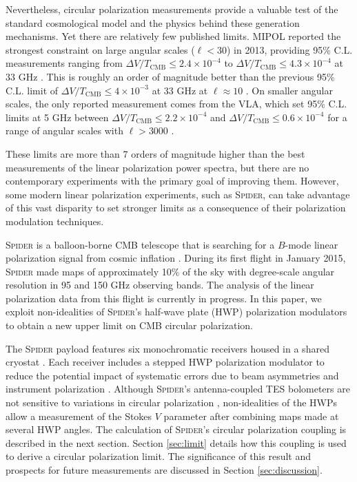 \documentclass[twocolumn]{aastex61}
\begin{document}
Nevertheless, circular polarization measurements provide a valuable test of the standard cosmological model and the physics behind these generation mechanisms.  Yet there are relatively few published limits.  MIPOL reported the strongest constraint on large angular scales ($\ell < 30$) in 2013, providing  95\% C.L. measurements ranging from $\Delta V/T_{\mathrm{CMB}}\leq 2.4 \times 10^{-4} $ to $\Delta V/T_{\mathrm{CMB}}\leq 4.3 \times 10^{-4} $  at 33 GHz \citep{Mipol}. This is roughly an order of magnitude better than the previous 95\% C.L. limit of $\Delta V/T_{\mathrm{CMB}}\leq 4 \times 10^{-3} $ at 33 GHz at $\ell \approx 10$ \citep{Vlim2}.  On smaller angular scales, the only reported measurement comes from the VLA, which set 95\% C.L. limits at 5 GHz between $\Delta V/T_{\mathrm{CMB}}\leq 2.2 \times 10^{-4} $ and $\Delta V/T_{\mathrm{CMB}}\leq 0.6 \times 10^{-4} $ for a range of angular scales with $\ell > 3000$ \citep{Vlim3}. 

These limits are more than 7 orders of magnitude higher than the best measurements of the linear polarization power spectra, but there are no contemporary experiments with the primary goal of improving them.  However, some modern linear polarization experiments, such as \textsc{Spider}, can take advantage of this vast disparity to set stronger limits as a consequence of their polarization modulation techniques. 

\textsc{Spider} is a balloon-borne CMB telescope that is searching for a $B$-mode linear polarization signal from cosmic inflation \citep{Fraisse, Rahlin2014}.  During its first flight in January 2015, \textsc{Spider} made maps of approximately 10\% of the sky with degree-scale angular resolution in 95 and 150 GHz observing bands.  The analysis of the linear polarization data from this flight is currently in progress.  In this paper, we exploit non-idealities of \textsc{Spider}'s half-wave plate (HWP) polarization modulators to obtain a new upper limit on CMB circular polarization. 

The \textsc{Spider} payload features six monochromatic receivers housed in a shared cryostat \citep{cryo_paper}.  Each receiver includes a stepped HWP polarization modulator to reduce the potential impact of systematic errors due to beam asymmetries and instrument polarization \citep{Sean_thesis, mechanism_paper}.  Although \textsc{Spider}'s antenna-coupled TES bolometers are not sensitive to variations in circular polarization \citep{JPL_detectors}, non-idealities of the HWPs allow a measurement of the Stokes $V$ parameter after combining maps made at several HWP angles.  The calculation of \textsc{Spider}'s circular polarization coupling is described in the next section.  Section \ref{sec:limit} details how this coupling is used to derive a circular polarization limit.  The significance of this result and prospects for future measurements are discussed in Section \ref{sec:discussion}.
\end{document}
